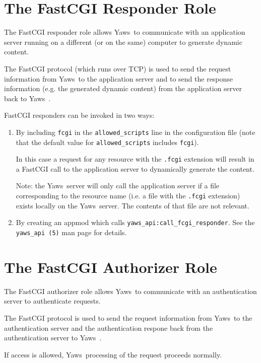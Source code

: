 \documentclass[11pt,oneside,english]{book}
\newcommand{\Yaws}            %
        {{\sc Yaws}}
\begin{document}
\section{The FastCGI Responder Role}

The FastCGI responder role allows \Yaws\  to communicate with an
application server running on a different (or on the same) computer
to generate dynamic content.

The FastCGI protocol (which runs over TCP) is used to send the request
information from \Yaws\  to the application server and to send the
response information (e.g. the generated dynamic content) from
the application server back to \Yaws\ .

FastCGI responders can be invoked in two ways:

\begin{enumerate}

\item
By including \verb+fcgi+ in the \verb+allowed_scripts+ line
in the configuration file (note that the default value for
\verb+allowed_scripts+ includes \verb+fcgi+).

In this case a request for any resource with the \verb+.fcgi+
extension will result in a FastCGI call to the application server to
dynamically generate the content.

Note: the \Yaws\  server will only call the application server if a file
corresponding to the resource name (i.e. a file with the \verb+.fcgi+
extension) exists locally on the \Yaws\  server. The contents of that
file are not relevant.

\item
By creating an appmod which calls \verb+yaws_api:call_fcgi_responder+.
See the \verb+yaws_api (5)+ man page for details.

\end{enumerate}

\section{The FastCGI Authorizer Role}

The FastCGI authorizer role allows \Yaws\  to communicate with an
authentication server to authenticate requests.

The FastCGI protocol is used to send the request information from
\Yaws\  to the authentication server and the authentication respone back
from the authentication server to \Yaws\ .

If access is allowed, \Yaws\  processing of the request proceeds
normally.
\end{document}
